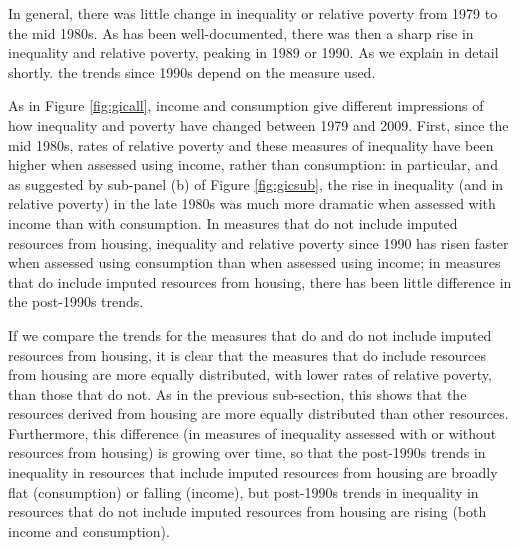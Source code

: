 In general, there was little change in inequality or relative poverty from 1979 to the mid 1980s. As has been well-documented, there was then a sharp rise in inequality and relative poverty, peaking in 1989 or 1990. As we explain in detail shortly. the trends since 1990s depend on the measure used.

As in Figure \ref{fig:gicall}, income and consumption give different impressions of how inequality and poverty have changed between 1979 and 2009. First, since the mid 1980s, rates of relative poverty and these measures of inequality have been higher when assessed using income, rather than consumption: in particular, and as suggested by sub-panel (b) of Figure \ref{fig:gicsub}, the rise in inequality (and in relative poverty) in the late 1980s was much more dramatic when assessed with income than with consumption.  In measures that do not include imputed resources from housing, inequality and relative poverty since 1990 has risen faster when assessed using consumption than when assessed using income; in measures that do include imputed resources from housing, there has been little difference in the post-1990s trends.

If we compare the trends for the measures that do and do not include imputed resources from housing, it is clear that the measures that do include resources from housing are more equally distributed, with lower rates of relative poverty, than those that do not. As in the previous sub-section, this shows that the resources derived from housing are more equally distributed than other resources. Furthermore, this difference (in measures of inequality assessed with or without resources from housing) is growing over time, so that the post-1990s trends in inequality in resources that include imputed resources from housing are broadly flat (consumption) or falling (income), but post-1990s trends in inequality in resources that do not include imputed resources from housing are rising (both income and consumption).


